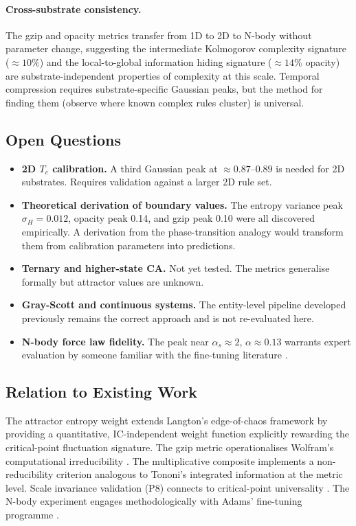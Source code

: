 \documentclass[12pt,a4paper]{article}
\begin{document}
\paragraph{Cross-substrate consistency.}
The gzip and opacity metrics transfer from 1D to 2D to N-body without parameter
change, suggesting the intermediate Kolmogorov complexity signature ($\approx 10\%$)
and the local-to-global information hiding signature ($\approx 14\%$ opacity)
are substrate-independent properties of complexity at this scale.
Temporal compression requires substrate-specific Gaussian peaks, but the
method for finding them (observe where known complex rules cluster) is universal.

\subsection{Open Questions}

\begin{itemize}[noitemsep]
  \item \textbf{2D $T_c$ calibration.}
    A third Gaussian peak at $\approx 0.87$--$0.89$ is needed for 2D substrates.
    Requires validation against a larger 2D rule set.
  \item \textbf{Theoretical derivation of boundary values.}
    The entropy variance peak $\sigma_H = 0.012$, opacity peak 0.14, and
    gzip peak 0.10 were all discovered empirically.
    A derivation from the phase-transition analogy would transform them
    from calibration parameters into predictions.
  \item \textbf{Ternary and higher-state CA.}
    Not yet tested. The metrics generalise formally but attractor values
    are unknown.
  \item \textbf{Gray-Scott and continuous systems.}
    The entity-level pipeline developed previously remains the correct approach
    and is not re-evaluated here.
  \item \textbf{N-body force law fidelity.}
    The peak near $\alpha_s \approx 2$, $\alpha \approx 0.13$ warrants
    expert evaluation by someone familiar with the fine-tuning literature
    \citep{adams2019}.
\end{itemize}

\subsection{Relation to Existing Work}

The attractor entropy weight extends Langton's edge-of-chaos framework
\citep{langton1990} by providing a quantitative, IC-independent weight function
explicitly rewarding the critical-point fluctuation signature.
The gzip metric operationalises Wolfram's computational irreducibility
\citep{wolfram2002}.
The multiplicative composite implements a non-reducibility criterion analogous
to Tononi's integrated information \citep{tononi2004} at the metric level.
Scale invariance validation (P8) connects to critical-point universality
\citep{bak1987}.
The N-body experiment engages methodologically with Adams' fine-tuning
programme \citep{adams2019}.
\end{document}
